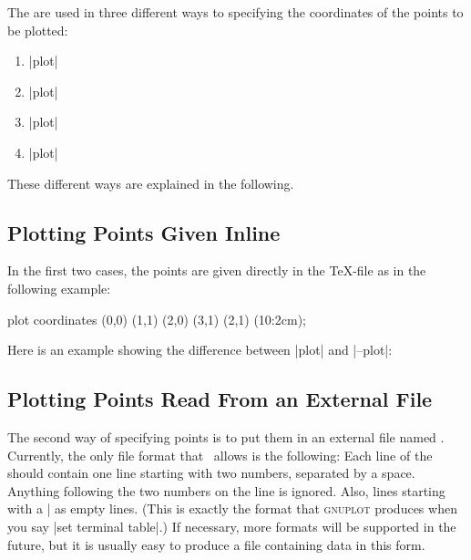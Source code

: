 The  are used in three different ways to
specifying the coordinates of the points to be plotted:

\begin{enumerate}
\item
  \opt{|--|}|plot|
\item
  \opt{|--|}|plot|
\item
  \opt{|--|}|plot|
\item
  \opt{|--|}|plot|
\end{enumerate}

These different ways are explained in the following.


\subsection{Plotting Points Given Inline}

In the first two cases, the points are given directly in the \TeX-file
as in the following example:

\begin{codeexample}[]
\tikz \draw plot coordinates {(0,0) (1,1) (2,0) (3,1) (2,1) (10:2cm)};
\end{codeexample}

Here is an example showing the difference between |plot| and |--plot|:

\begin{codeexample}[]
\end{codeexample}


\subsection{Plotting Points Read From an External File}

The second way of specifying points is to put them in an external
file named . Currently, the only file format that
\tikzname\ allows is the following: Each line of the 
should contain one line starting with two numbers, separated by a
space. Anything following the two numbers on the line is
ignored. Also, lines starting with a |%
as empty lines. (This is exactly the format that \textsc{gnuplot}
produces when you say |set terminal table|.) If necessary, more
formats will be supported in the future, but it is usually easy to
produce a file containing data in this form.

